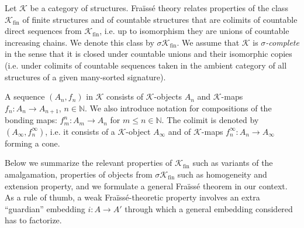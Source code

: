 \documentclass[oneside,notitlepage,12pt]{article}
\theoremstyle{definition}
\theoremstyle{remark}
\newcommand \maps {\colon} %
\newcommand \sig {\sigma}
\newcommand \N {\mathbb{N}}
\newcommand \K {\mathscr{K}}
\newcommand \fin {{\operatorname{fin}}}
\begin{document}
Let $\K$ be a category of structures.
Fraïssé theory relates properties of the class $\K_\fin$ of finite structures and of countable structures that are colimits of countable direct sequences from $\K_\fin$, i.e. up to isomorphism they are unions of countable increasing chains.
We denote this class by $\sig\K_\fin$.
We assume that $\K$ is \emph{$\sigma$-complete} in the sense that it is closed under countable unions and their isomorphic copies (i.e. under colimits of countable sequences taken in the ambient category of all structures of a given many-sorted signature).

A sequence $(A_n, f_n)$ in $\K$ consists of $\K$-objects $A_n$ and $\K$-maps $f_n\maps A_n \to A_{n + 1}$, $n \in \N$.
We also introduce notation for compositions of the bonding maps: $f_m^n\maps A_m \to A_n$ for $m \leq n \in \N$.
The colimit is denoted by $(A_\infty, f^\infty_n)$, i.e. it consists of a $\K$-object $A_\infty$ and of $\K$-maps $f_n^\infty\maps A_n \to A_\infty$ forming a cone.

Below we summarize the relevant properties of $\K_\fin$ such as variants of the amalgamation, properties of objects from $\sig\K_\fin$ such as homogeneity and extension property, and we formulate a general Fraïssé theorem in our context.
As a rule of thumb, a weak Fraïssé-theoretic property involves an extra ``guardian'' embedding $i\maps A \to A'$ through which a general embedding considered has to factorize.
\end{document}
